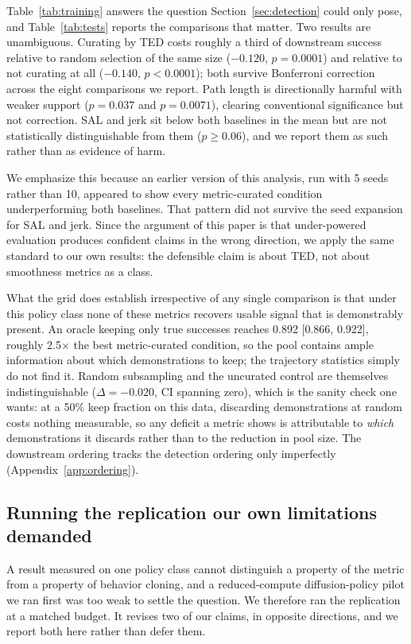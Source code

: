 \documentclass[10pt]{article}
\begin{document}
Table~\ref{tab:training} answers the question Section~\ref{sec:detection}
could only pose, and Table~\ref{tab:tests} reports the comparisons that
matter. Two results are unambiguous. Curating by TED costs roughly a third
of downstream success relative to random selection of the same size
($-0.120$, $p = 0.0001$) and relative to not curating at all ($-0.140$,
$p < 0.0001$); both survive Bonferroni correction across the eight
comparisons we report. Path length is directionally harmful with weaker
support ($p = 0.037$ and $p = 0.0071$), clearing conventional significance
but not correction. SAL and jerk sit below both baselines in the mean but
are not statistically distinguishable from them ($p \geq 0.06$), and we
report them as such rather than as evidence of harm.

We emphasize this because an earlier version of this analysis, run with
5 seeds rather than 10, appeared to show every metric-curated condition
underperforming both baselines. That pattern did not survive the seed
expansion for SAL and jerk. Since the argument of this paper is that
under-powered evaluation produces confident claims in the wrong direction,
we apply the same standard to our own results: the defensible claim is about
TED, not about smoothness metrics as a class.

What the grid does establish irrespective of any single comparison is that
under this policy class none of these metrics recovers usable signal that is
demonstrably present.
An oracle keeping only true successes reaches 0.892 [0.866, 0.922], roughly
2.5$\times$ the best metric-curated condition, so the pool contains ample
information about which demonstrations to keep; the trajectory statistics
simply do not find it. Random subsampling and the uncurated control are
themselves indistinguishable ($\Delta = -0.020$, CI spanning zero), which is
the sanity check one wants: at a 50\% keep fraction on this data, discarding
demonstrations at random costs nothing measurable, so any deficit a metric
shows is attributable to \emph{which} demonstrations it discards rather than
to the reduction in pool size. The downstream ordering tracks the detection
ordering only imperfectly (Appendix~\ref{app:ordering}).

\subsection{Running the replication our own limitations demanded}
\label{sec:crossarch}

A result measured on one policy class cannot distinguish a property of the
metric from a property of behavior cloning, and a reduced-compute
diffusion-policy pilot we ran first was too weak to settle the question. We
therefore ran the replication at a matched budget. It revises two of our
claims, in opposite directions, and we report both here rather than
defer them.
\end{document}
